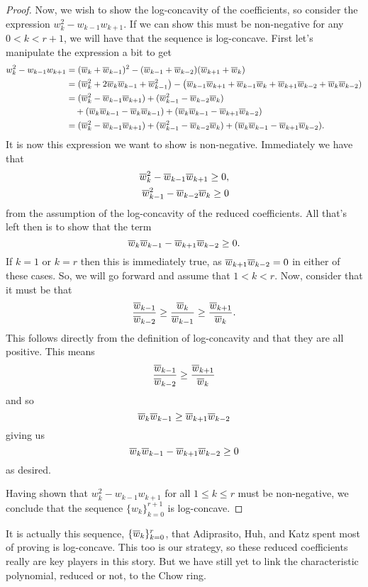 \documentclass[12pt,oneside]{../../sfsuthesis}
\begin{document}
\begin{proof}
    Now, we wish to show the log-concavity of the coefficients, so consider the expression \( w_k^2 - w_{k-1}w_{k+1} \).
    If we can show this must be non-negative for any \( 0 < k < r+1 \), we will have that the sequence is log-concave.
    First let's manipulate the expression a bit to get
    \begin{align*}
        w_k^2 - w_{k-1}w_{k+1} & = (\overline{w}_k + \overline{w}_{k-1})^2 - (\overline{w}_{k-1} + \overline{w}_{k-2})(\overline{w}_{k+1} + \overline{w}_{k})                                                                     \\
                               & = (\overline{w}_k^2 + 2\overline{w}_k \overline{w}_{k-1} + \overline{w}_{k-1}^2 \big) - \big( \overline{w}_{k-1} \overline{w}_{k+1} + \overline{w}_{k-1}\overline{w}_{k} + \overline{w}_{k+1}\overline{w}_{k-2} + \overline{w}_{k} \overline{w}_{k-2}) \\
                               & = (\overline{w}_k^2 - \overline{w}_{k-1}\overline{w}_{k+1}) + (\overline{w}_{k-1}^2 - \overline{w}_{k-2}\overline{w}_{k})                                                                        \\
                               & \quad + (\overline{w}_k \overline{w}_{k-1} - \overline{w}_k \overline{w}_{k-1}) + (\overline{w}_k \overline{w}_{k-1} - \overline{w}_{k+1} \overline{w}_{k-2} )                                                     \\
                               & = (\overline{w}_k^2 - \overline{w}_{k-1}\overline{w}_{k+1}) + (\overline{w}_{k-1}^2 - \overline{w}_{k-2}\overline{w}_{k}) + (\overline{w}_k \overline{w}_{k-1} - \overline{w}_{k+1} \overline{w}_{k-2} ).
    \end{align*}
    It is now this expression we want to show is non-negative.
    Immediately we have that
    \begin{align*}
        \overline{w}_k^2 - \overline{w}_{k-1}\overline{w}_{k+1} \geq 0, \\
        \overline{w}_{k-1}^2 - \overline{w}_{k-2}\overline{w}_{k} \geq 0
    \end{align*}
    from the assumption of the log-concavity of the reduced coefficients.
    All that's left then is to show that the term
    \[
        \overline{w}_k \overline{w}_{k-1} - \overline{w}_{k+1} \overline{w}_{k-2} \geq 0.
    \]
    If \( k = 1 \) or \( k = r \) then this is immediately true, as \(\overline{w}_{k+1} \overline{w}_{k-2} = 0\) in either of these cases.
    So, we will go forward and assume that \( 1 < k < r \).
    Now, consider that it must be that
    \[
        \frac{\overline{w}_{k-1}}{\overline{w}_{k-2}} \geq \frac{\overline{w}_k}{\overline{w}_{k-1}} \geq \frac{\overline{w}_{k+1}}{\overline{w}_k}.
    \]
    This follows directly from the definition of log-concavity and that they are all positive.
    This means
    \[
        \frac{\overline{w}_{k-1}}{\overline{w}_{k-2}} \geq \frac{\overline{w}_{k+1}}{\overline{w}_k}
    \]
    and so
    \[
        \overline{w}_k \overline{w}_{k-1} \geq \overline{w}_{k+1} \overline{w}_{k-2}
    \]
    giving us
    \[
        \overline{w}_k \overline{w}_{k-1} - \overline{w}_{k+1} \overline{w}_{k-2} \geq 0
    \]
    as desired.

    Having shown that \( w_k^2 - w_{k-1}w_{k+1} \) for all \( 1 \leq k \leq r \) must be non-negative, we conclude that the sequence \( \{ w_k \}_{k=0}^{r+1} \) is log-concave.
\end{proof}
It is actually this sequence, \(\{\overline{w}_k\}_{k=0}^r \), that Adiprasito, Huh, and Katz spent most of \cite{adiprasitoHodgeTheoryCombinatorial2018} proving is log-concave.
This too is our strategy, so these reduced coefficients really are key players in this story.
But we have still yet to link the characteristic polynomial, reduced or not, to the Chow ring.
\end{document}
